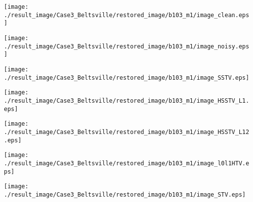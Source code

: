 \begin{figure*}[t]
	\begin{center}
		\begin{minipage}{0.125\hsize}
			\centerline{\texttt{[image: ./result\_image/Case3\_Beltsville/restored\_image/b103\_m1/image\_clean.eps]}} %
		\end{minipage}
		\begin{minipage}{0.125\hsize}
			\centerline{\texttt{[image: ./result\_image/Case3\_Beltsville/restored\_image/b103\_m1/image\_noisy.eps]}} %
		\end{minipage}
		\begin{minipage}{0.125\hsize}
			\centerline{\texttt{[image: ./result\_image/Case3\_Beltsville/restored\_image/b103\_m1/image\_SSTV.eps]}} %
		\end{minipage}
		\begin{minipage}{0.125\hsize}
			\centerline{\texttt{[image: ./result\_image/Case3\_Beltsville/restored\_image/b103\_m1/image\_HSSTV\_L1.eps]}} %
		\end{minipage}
		\begin{minipage}{0.125\hsize}
			\centerline{\texttt{[image: ./result\_image/Case3\_Beltsville/restored\_image/b103\_m1/image\_HSSTV\_L12.eps]}} %
		\end{minipage}
		\begin{minipage}{0.125\hsize}
			\centerline{\texttt{[image: ./result\_image/Case3\_Beltsville/restored\_image/b103\_m1/image\_l0l1HTV.eps]}} %
		\end{minipage}
		\begin{minipage}{0.125\hsize}
			\centerline{\texttt{[image: ./result\_image/Case3\_Beltsville/restored\_image/b103\_m1/image\_STV.eps]}} %
		\end{minipage}
		\begin{minipage}{0.050\hsize}
			\centerline{\hspace{\hsize}} %
		\end{minipage}
		
		\vspace{1mm}
		

\end{center}
\end{figure*}

